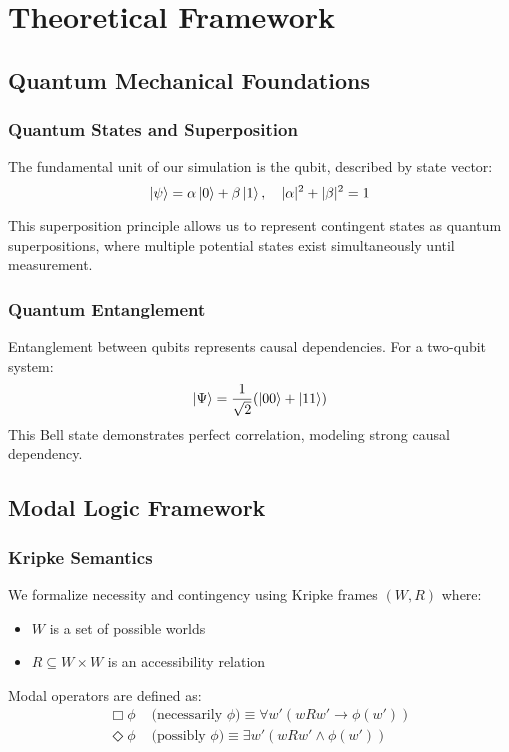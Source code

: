 \section{Theoretical Framework}\label{sec:theory}

\subsection{Quantum Mechanical Foundations}
\subsubsection{Quantum States and Superposition}
The fundamental unit of our simulation is the qubit, described by state vector:
\begin{equation}
    \ket{\psi} = \alpha\ket{0} + \beta\ket{1}, \quad |\alpha|^2 + |\beta|^2 = 1
\end{equation}

This superposition principle allows us to represent contingent states as quantum superpositions, where multiple potential states exist simultaneously until measurement.

\subsubsection{Quantum Entanglement}
Entanglement between qubits represents causal dependencies. For a two-qubit system:
\begin{equation}
    \ket{\Psi} = \frac{1}{\sqrt{2}}(\ket{00} + \ket{11})
\end{equation}
This Bell state demonstrates perfect correlation, modeling strong causal dependency.

\subsection{Modal Logic Framework}
\subsubsection{Kripke Semantics}
We formalize necessity and contingency using Kripke frames $(W, R)$ where:
\begin{itemize}
    \item $W$ is a set of possible worlds
    \item $R \subseteq W \times W$ is an accessibility relation
\end{itemize}

Modal operators are defined as:
\begin{align}
    \Box \phi &\text{ (necessarily } \phi\text{)} \equiv \forall w' (wRw' \rightarrow \phi(w')) \\
    \Diamond \phi &\text{ (possibly } \phi\text{)} \equiv \exists w' (wRw' \wedge \phi(w'))
\end{align}

